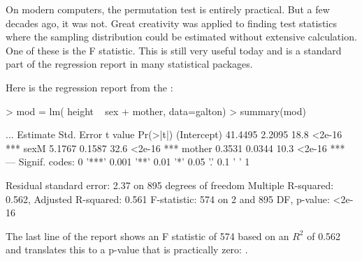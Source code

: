 On modern computers, the permutation test is entirely practical.  But
a few decades ago, it was not.  Great creativity was applied to
finding test statistics where the sampling distribution could be
estimated without extensive calculation.  One of these is the F
statistic.  This is still very useful today and is a standard part of
the regression report in many statistical packages.  


Here is the regression report from the
:
\begin{Schunk}
\begin{Sinput}
> mod = lm( height ~ sex + mother, data=galton)
> summary(mod)
\end{Sinput}
\begin{Soutput}
...
            Estimate Std. Error t value Pr(>|t|)    
(Intercept)  41.4495     2.2095    18.8   <2e-16 ***
sexM          5.1767     0.1587    32.6   <2e-16 ***
mother        0.3531     0.0344    10.3   <2e-16 ***
---
Signif. codes:  0 '***' 0.001 '**' 0.01 '*' 0.05 '.' 0.1 ' ' 1 

Residual standard error: 2.37 on 895 degrees of freedom
Multiple R-squared: 0.562,	Adjusted R-squared: 0.561 
F-statistic:  574 on 2 and 895 DF,  p-value: <2e-16 
\end{Soutput}
\end{Schunk}
The last line of the report
shows an F statistic of 574 based on an $R^2$ of 0.562 and
translates this to a p-value that is practically zero: .

